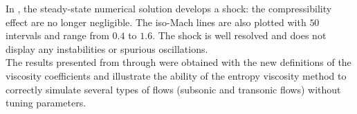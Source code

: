 In , the steady-state numerical solution develops a shock: the compressibility effect are no longer negligible. The iso-Mach lines are also plotted with $50$ intervals and range from $0.4$ to $1.6$. The shock is well resolved and does not display any instabilities or spurious oscillations. \\
The results presented from  through  were obtained with the new definitions of the viscosity coefficients and illustrate the ability of the entropy viscosity method to correctly simulate several types of flows (subsonic and transonic flows) without tuning parameters.
